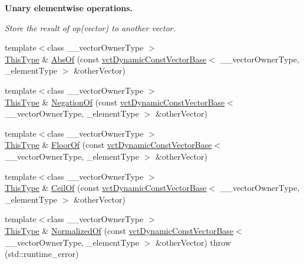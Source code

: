 \begin{Indent}{\bf Unary elementwise operations.}\par
{\em Store the result of op(vector) to another vector. }\begin{DoxyCompactItemize}
\item 
{\footnotesize template$<$class \-\_\-\-\_\-vector\-Owner\-Type $>$ }\\\hyperlink{classvct_dynamic_const_vector_base_a39da273523717f678f54d3321ebca3dd}{This\-Type} \& \hyperlink{classvct_dynamic_vector_base_a41137c2be55ad6cfdfedb695e7b82ead}{Abs\-Of} (const \hyperlink{classvct_dynamic_const_vector_base}{vct\-Dynamic\-Const\-Vector\-Base}$<$ \-\_\-\-\_\-vector\-Owner\-Type, \-\_\-element\-Type $>$ \&other\-Vector)
\item 
{\footnotesize template$<$class \-\_\-\-\_\-vector\-Owner\-Type $>$ }\\\hyperlink{classvct_dynamic_const_vector_base_a39da273523717f678f54d3321ebca3dd}{This\-Type} \& \hyperlink{classvct_dynamic_vector_base_a9f6f640db32ecb6de8c30fe6e4ea708e}{Negation\-Of} (const \hyperlink{classvct_dynamic_const_vector_base}{vct\-Dynamic\-Const\-Vector\-Base}$<$ \-\_\-\-\_\-vector\-Owner\-Type, \-\_\-element\-Type $>$ \&other\-Vector)
\item 
{\footnotesize template$<$class \-\_\-\-\_\-vector\-Owner\-Type $>$ }\\\hyperlink{classvct_dynamic_const_vector_base_a39da273523717f678f54d3321ebca3dd}{This\-Type} \& \hyperlink{classvct_dynamic_vector_base_ad0f2f07cd961899b254df8ea725d1bc7}{Floor\-Of} (const \hyperlink{classvct_dynamic_const_vector_base}{vct\-Dynamic\-Const\-Vector\-Base}$<$ \-\_\-\-\_\-vector\-Owner\-Type, \-\_\-element\-Type $>$ \&other\-Vector)
\item 
{\footnotesize template$<$class \-\_\-\-\_\-vector\-Owner\-Type $>$ }\\\hyperlink{classvct_dynamic_const_vector_base_a39da273523717f678f54d3321ebca3dd}{This\-Type} \& \hyperlink{classvct_dynamic_vector_base_aa0c44a54e66a3a355da37e5eec4b3835}{Ceil\-Of} (const \hyperlink{classvct_dynamic_const_vector_base}{vct\-Dynamic\-Const\-Vector\-Base}$<$ \-\_\-\-\_\-vector\-Owner\-Type, \-\_\-element\-Type $>$ \&other\-Vector)
\item 
{\footnotesize template$<$class \-\_\-\-\_\-vector\-Owner\-Type $>$ }\\\hyperlink{classvct_dynamic_const_vector_base_a39da273523717f678f54d3321ebca3dd}{This\-Type} \& \hyperlink{classvct_dynamic_vector_base_aa5ef903765165168fa48f9c5f8403fd5}{Normalized\-Of} (const \hyperlink{classvct_dynamic_const_vector_base}{vct\-Dynamic\-Const\-Vector\-Base}$<$ \-\_\-\-\_\-vector\-Owner\-Type, \-\_\-element\-Type $>$ \&other\-Vector)  throw (std\-::runtime\-\_\-error)
\end{DoxyCompactItemize}
\end{Indent}
